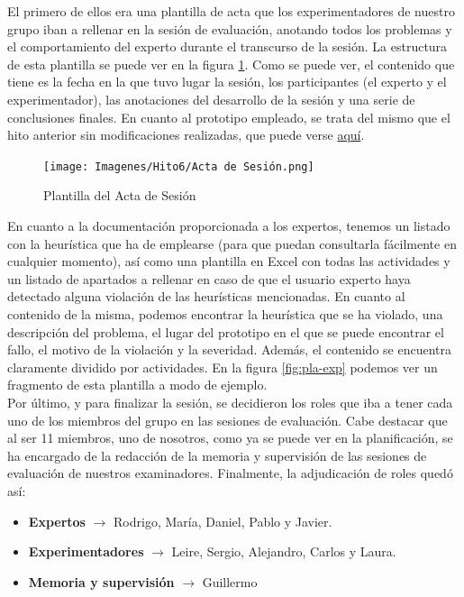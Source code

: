 El primero de ellos era una plantilla de acta que los experimentadores de nuestro grupo iban a rellenar en la sesión de evaluación, anotando todos los problemas y el comportamiento del experto
durante el transcurso de la sesión. La estructura de esta plantilla se puede ver en la figura \ref{fig:pla-actases}. Como se puede ver, el contenido que tiene es la fecha en la que tuvo lugar la sesión,
los participantes (el experto y el experimentador), las anotaciones del desarrollo de la sesión y una serie de conclusiones finales. En cuanto al prototipo empleado, se trata
del mismo que el hito anterior sin modificaciones realizadas, que puede verse \href{https://www.figma.com/file/YGz2UUMhvxNOTCHhu1TZle/Just-Travel-It?type=design&node-id=0%3A1&mode=design&t=18R6j8wE0vfjz3qF-1}{aquí}.
\begin{figure}[h]
    \centering
    \texttt{[image: Imagenes/Hito6/Acta de Sesión.png]}
    \caption{Plantilla del Acta de Sesión}
    \label{fig:pla-actases}
\end{figure}

En cuanto a la documentación proporcionada a los expertos, tenemos un listado con la heurística que ha de emplearse (para que puedan consultarla fácilmente en cualquier momento), así como una plantilla en Excel
con todas las actividades y un listado de apartados a rellenar en caso de que el usuario experto haya detectado alguna violación de las heurísticas mencionadas. En cuanto al contenido de la misma, podemos 
encontrar la heurística que se ha violado, una descripción del problema, el lugar del prototipo en el que se puede encontrar el fallo, el motivo de la violación y la severidad. Además, el contenido se encuentra
claramente dividido por actividades. En la figura \ref{fig:pla-exp} podemos ver un fragmento de esta plantilla a modo de ejemplo. \\

Por último, y para finalizar la sesión, se decidieron los roles que iba a tener cada uno de los miembros del grupo en las sesiones de evaluación. Cabe destacar que al ser 11 miembros, uno de nosotros, como ya se puede
ver en la planificación, se ha encargado de la redacción de la memoria y supervisión de las sesiones de evaluación de nuestros examinadores. Finalmente, la adjudicación de roles quedó así:
\begin{itemize}
    \item \textbf{Expertos} $\rightarrow$ Rodrigo, María, Daniel, Pablo y Javier.
    \item \textbf{Experimentadores} $\rightarrow$ Leire, Sergio, Alejandro, Carlos y Laura.
    \item \textbf{Memoria y supervisión} $\rightarrow$ Guillermo
\end{itemize}

